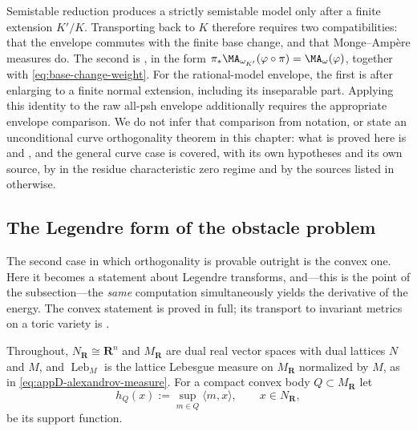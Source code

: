 \begin{remark}
\label{rem:ch27-curve-base-change}
Semistable reduction produces a strictly semistable model only after a
finite extension \(K'/K\).  Transporting
 back to \(K\) therefore requires
two compatibilities: that the envelope commutes with the finite base change,
and that Monge--Amp\`ere measures do.  The second is
, in the form
\(\pi_*\MA_{\omega_{K'}}(\varphi\circ\pi)=\MA_\omega(\varphi)\), together
with \eqref{eq:base-change-weight}.  For the rational-model envelope,
the first is \cite[Proposition~2.11]{GJKM19} after enlarging to a finite
normal extension, including its inseparable part.  Applying this identity
to the raw all-psh envelope additionally requires the appropriate envelope
comparison.  We do not infer that comparison from notation, or state an
unconditional curve orthogonality theorem in this chapter: what is proved
here is  and
, and the general curve case is
covered, with its own hypotheses and its own source, by
 in the residue characteristic zero
regime and by the sources listed in
 otherwise.
\end{remark}

\subsection{The Legendre form of the obstacle problem}
\label{sec:ch27-legendre}

The second case in which orthogonality is provable outright is the convex
one.  Here it becomes a statement about Legendre transforms, and---this is
the point of the subsection---the \emph{same} computation simultaneously
yields the derivative of the energy.  The convex statement is proved in
full; its transport to invariant metrics on a toric variety is
.

Throughout, \(N_{\mathbf R}\cong\mathbf R^n\) and \(M_{\mathbf R}\) are dual
real vector spaces with dual lattices \(N\) and \(M\), and
\(\operatorname{Leb}_M\) is the lattice Lebesgue measure on
\(M_{\mathbf R}\) normalized by \(M\), as in
\eqref{eq:appD-alexandrov-measure}.  For a compact convex body
\(Q\subset M_{\mathbf R}\) let
\[
 h_Q(x):=\sup_{m\in Q}\langle m,x\rangle,
 \qquad x\in N_{\mathbf R},
\]
be its support function.

